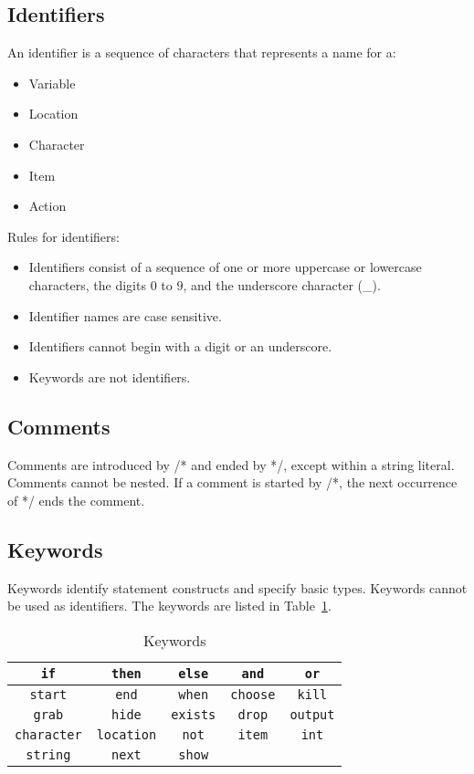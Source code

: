 \documentclass[12pt]{article}
\begin{document}
\subsection{Identifiers}
An identifier is a sequence of characters that represents a name for a:
\begin{itemize}
\item Variable
\item Location
\item Character
\item Item
\item Action \\
\end{itemize}

\noindent Rules for identifiers:
\begin{itemize}
\item Identifiers consist of a sequence of one or more uppercase or lowercase characters, the digits 0 to 9, and the underscore character (\_).
\item Identifier names are case sensitive.
\item Identifiers cannot begin with a digit or an underscore.
\item Keywords are not identifiers.
\end{itemize}

\subsection{Comments}
Comments are introduced by /* and ended by */, except within a string literal.
Comments cannot be nested.  If a comment is started by /*, the next occurrence of */ ends the comment.

\subsection{Keywords}
Keywords identify statement constructs and specify basic types.  Keywords cannot be used as identifiers.  The keywords are listed in Table~\ref{keywords}.

\begin{table}[htdp]
\caption{Keywords}
\begin{center}
\begin{tabular}{|c|c|c|c|c|}
\hline
\texttt{if} & \texttt{then} & \texttt{else} & \texttt{and} & \texttt{or} \\
\hline
\texttt{start} & \texttt{end} & \texttt{when} & \texttt{choose} & \texttt{kill} \\
\hline
\texttt{grab} & \texttt{hide} & \texttt{exists} & \texttt{drop} & \texttt{output} \\
\hline
\texttt{character} & \texttt{location} & \texttt{not} & \texttt{item} & \texttt{int} \\
\hline
\texttt{string} & \texttt{next} & \texttt{show} & &  \\
\hline
\end{tabular}
\end{center}
\label{keywords}
\end{table}
\end{document}
